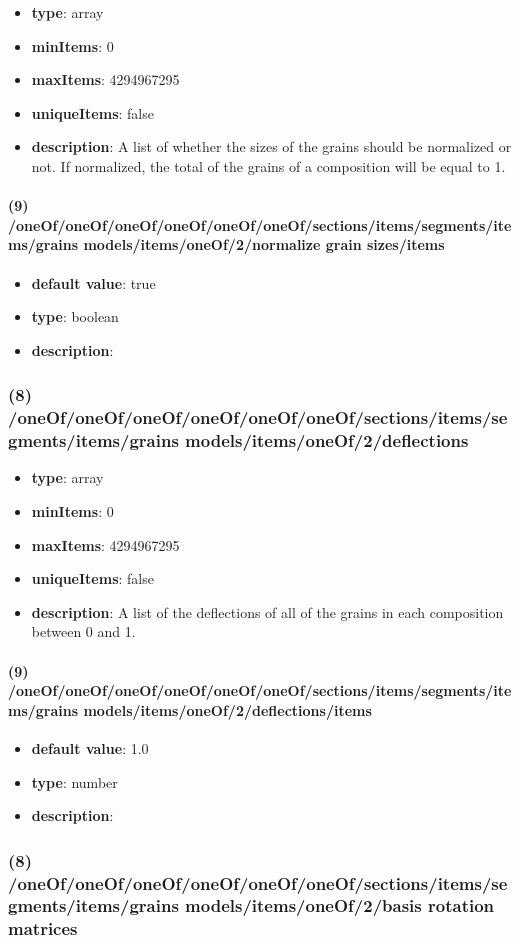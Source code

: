 \begin{itemize}[leftmargin=8em]\item {\bf type}: array
\item {\bf minItems}: 0
\item {\bf maxItems}: 4294967295
\item {\bf uniqueItems}: false
\item {\bf description}: A list of whether the sizes of the grains should be normalized or not. If normalized, the total of the grains of a composition will be equal to 1.
\end{itemize}\paragraph{(9) /oneOf/oneOf/oneOf/oneOf/oneOf/oneOf/sections/items/segments/items/grains models/items/oneOf/2/normalize grain sizes/items}
\begin{itemize}[leftmargin=9em]\item {\bf default value}: true
\item {\bf type}: boolean
\item {\bf description}: 
\end{itemize}\subsubsection{(8) /oneOf/oneOf/oneOf/oneOf/oneOf/oneOf/sections/items/segments/items/grains models/items/oneOf/2/deflections}
\begin{itemize}[leftmargin=8em]\item {\bf type}: array
\item {\bf minItems}: 0
\item {\bf maxItems}: 4294967295
\item {\bf uniqueItems}: false
\item {\bf description}: A list of the deflections of all of the grains in each composition between 0 and 1.
\end{itemize}\paragraph{(9) /oneOf/oneOf/oneOf/oneOf/oneOf/oneOf/sections/items/segments/items/grains models/items/oneOf/2/deflections/items}
\begin{itemize}[leftmargin=9em]\item {\bf default value}: 1.0
\item {\bf type}: number
\item {\bf description}: 
\end{itemize}\subsubsection{(8) /oneOf/oneOf/oneOf/oneOf/oneOf/oneOf/sections/items/segments/items/grains models/items/oneOf/2/basis rotation matrices}
